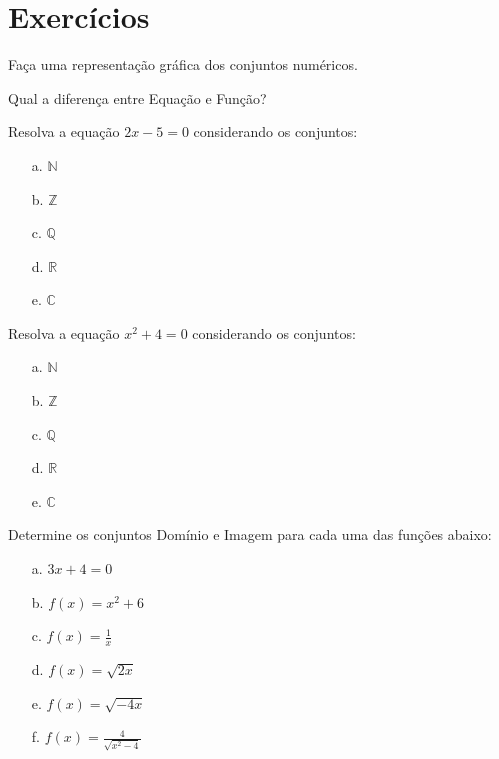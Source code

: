 \section{Exercícios}

\begin{exercise}
	Faça uma representação gráfica dos conjuntos numéricos.
\end{exercise}

\begin{exercise}
	Qual a diferença entre Equação e Função?
\end{exercise}

\begin{exercise}
	Resolva a equação $2x-5=0$ considerando os conjuntos:
	\begin{itemize}
		\item[a.]{$\mathbb{N}$}
		\item[b.]{$\mathbb{Z}$}
		\item[c.]{$\mathbb{Q}$}
		\item[d.]{$\mathbb{R}$}
		\item[e.]{$\mathbb{C}$}
	\end{itemize}
\end{exercise}

\begin{exercise}
	Resolva a equação $x^2+4=0$ considerando os conjuntos:
	\begin{itemize}
		\item[a.]{$\mathbb{N}$}
		\item[b.]{$\mathbb{Z}$}
		\item[c.]{$\mathbb{Q}$}
		\item[d.]{$\mathbb{R}$}
		\item[e.]{$\mathbb{C}$}
	\end{itemize}
\end{exercise}

\begin{exercise}
	Determine os conjuntos Domínio e Imagem para cada uma das funções abaixo:
	\begin{itemize}
		\item[a.]{$3x+4=0$}
		\item[b.]{$f(x) = x^2 + 6$}
		\item[c.]{$f(x) = \frac{1}{x}$}
		\item[d.]{$f(x) = \sqrt{2x}$}
		\item[e.]{$f(x) = \sqrt{-4x}$}
		\item[f.]{$f(x) = \frac{4}{\sqrt{x^2-4}}$}
	\end{itemize}
\end{exercise}

